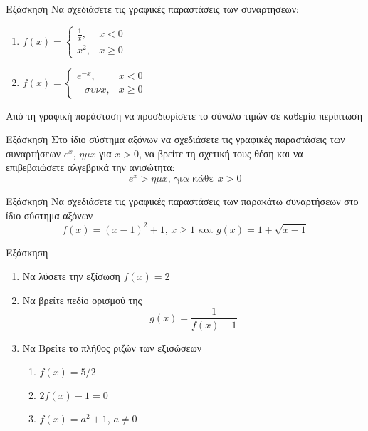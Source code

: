\documentclass[greek]{beamer}
\begin{document}
\begin{frame}{Εξάσκηση}
 Να σχεδιάσετε τις γραφικές παραστάσεις των συναρτήσεων:
 \begin{enumerate}
  \item<1->
        $f(x)=
         \begin{cases}
          \frac{1}{x}, & x<0    \\
          x^2,         & x\ge 0
         \end{cases}$

  \item<2-> $f(x)=
         \begin{cases}
          e^{-x}, & x<0    \\
          -συν x, & x\ge 0
         \end{cases}$
 \end{enumerate}
 Από τη γραφική παράσταση να προσδιορίσετε το σύνολο τιμών σε καθεμία περίπτωση
\end{frame}

\begin{frame}{Εξάσκηση}
 Στο ίδιο σύστημα αξόνων να σχεδιάσετε τις γραφικές παραστάσεις των συναρτήσεων $e^x$, $ημ x$ για $x>0$, να βρείτε τη σχετική τους θέση και να επιβεβαιώσετε αλγεβρικά την ανισώτητα:
 $$e^x>ημ x \text{, για κάθε } x>0$$
\end{frame}

\begin{frame}{Εξάσκηση}
 Να σχεδιάσετε τις γραφικές παραστάσεις των παρακάτω συναρτήσεων στο ίδιο σύστημα αξόνων
 $$f(x)=(x-1)^2+1\text{, } x\ge 1 \text{ και } g(x)=1+\sqrt{x-1}$$
\end{frame}

\begin{frame}{Εξάσκηση}
 \href{https://www.geogebra.org/m/euy2uhma}{}
 \begin{enumerate}
  \item<1-> Να λύσετε την εξίσωση $f(x)=2$
  \item<2-> Να βρείτε πεδίο ορισμού της $$g(x)=\frac{1}{f(x)-1}$$
  \item<3-> Να Βρείτε το πλήθος ριζών των εξισώσεων
        \begin{enumerate}
         \item<4-> $f(x)=5/2$
         \item<5-> $2f(x)-1=0$
         \item<6-> $f(x)=a^2+1$, $a\ne 0$
        \end{enumerate}
 \end{enumerate}
\end{frame}
\end{document}
